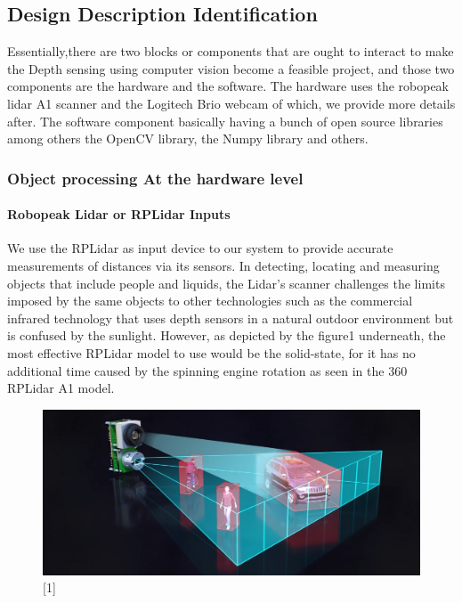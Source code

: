 \documentclass[10pt,draftclsnofoot,onecolumn,journal,compsoc]{IEEEtran}
\begin{document}
    \subsection{Design Description Identification}
   Essentially,there are two blocks or components that are ought to interact  to make the Depth sensing using computer vision become a feasible project, and those two components are the hardware and the software. The hardware uses the robopeak lidar A1 scanner and the Logitech Brio webcam of which, we provide more details after. The software component basically having a bunch of open source libraries among others the OpenCV library, the Numpy library and others.  
    	\subsubsection{Object processing At the hardware level}
    	\paragraph{\textbf {Robopeak Lidar or RPLidar Inputs}} 	
    	We use the RPLidar as input device to our system to provide accurate measurements of distances via its sensors. In detecting, locating and measuring objects that include people and liquids, the Lidar's scanner challenges the limits imposed by the same objects to other technologies such as the commercial infrared technology that uses  depth sensors in a natural outdoor environment but is confused by the sunlight. However, as depicted by the figure1 underneath, the most effective RPLidar model to use would be the solid-state, for it has no additional time caused by the spinning engine rotation as seen in the 360 RPLidar A1 model.
    	\\[2ex]
    	\begin{figure}[ht]
    	 \centering \includegraphics[width=4.5in,natwidth=4000,natheight=200]{images/LiDAR-fundamentals-2-1024x449.jpg}
    	\label{rplidar2}
    	\end{figure}
\end{document}
